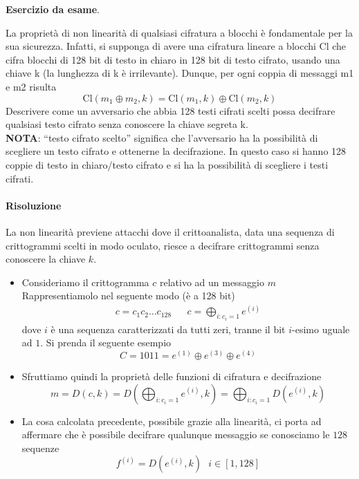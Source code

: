 \begin{framed}
	\noindent \textbf{Esercizio da esame}.
	
	\noindent La proprietà di non linearità di qualsiasi cifratura a blocchi è fondamentale per la sua sicurezza.
	Infatti, si supponga di avere una cifratura lineare a blocchi Cl che cifra blocchi di 128 bit di testo in
	chiaro in 128 bit di testo cifrato, usando una chiave k (la lunghezza di k è irrilevante). Dunque, per
	ogni coppia di messaggi m1 e m2 risulta
	$$\text{Cl}(m_1 \oplus m_2, k)=\text{Cl}(m_1,k) \oplus \text{Cl}(m_2,k)$$
	Descrivere come un avversario che abbia 128 testi cifrati scelti possa decifrare qualsiasi testo
	cifrato senza conoscere la chiave segreta k.\\
	\textbf{NOTA}: “testo cifrato scelto” significa che l’avversario ha la possibilità di scegliere un testo cifrato
	e ottenerne la decifrazione. In questo caso si hanno 128 coppie di testo in chiaro/testo cifrato e si ha
	la possibilità di scegliere i testi cifrati.
	
	\paragraph{Risoluzione} La non linearità previene attacchi dove il crittoanalista, data una sequenza di crittogrammi scelti in modo oculato, riesce a decifrare crittogrammi senza conoscere la chiave $k$. 
	\begin{itemize}
		\item Consideriamo il crittogramma $c$ relativo ad un messaggio $m$
		Rappresentiamolo nel seguente modo (è a 128 bit)
		\begin{align*}c=c_1c_2\dots c_{128}&&c=\bigoplus_{i:c_i=1}e^{(i)}\end{align*}
		dove $i$ è una sequenza caratterizzati da tutti zeri, tranne il bit $i$-esimo uguale ad $1$. Si prenda il seguente esempio 
		$$C=1011=e^{(1)} \oplus e^{(3)} \oplus e^{(4)} $$
		\item Sfruttiamo quindi la proprietà delle funzioni di cifratura e decifrazione
		$$m=D(c,k)=D\left(\bigoplus_{i:c_i=1}e^{(i)},k\right)=\bigoplus_{i:c_i=1} D(e^{(i)}, k)$$
		\item La cosa calcolata precedente, possibile grazie alla linearità, ci porta ad affermare che è possibile decifrare qualunque messaggio se conosciamo le $128$ sequenze
		$$f^{(i)}=D(e^{(i)}, k)\,\,\,\,i\in [1,128]$$
	\end{itemize}
\end{framed} 

